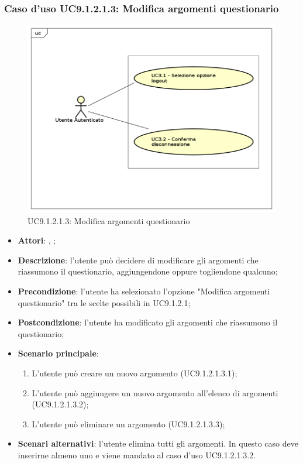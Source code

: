 					\subsubsection{Caso d'uso UC9.1.2.1.3: Modifica argomenti questionario}
					\label{UC9.1.2.1.3}
					\begin{figure}[h]
						\centering
					\includegraphics[scale=0.7,keepaspectratio]{UML/UC9.png}
						\caption{UC9.1.2.1.3: Modifica argomenti questionario}
					\end{figure}
					\FloatBarrier
					\begin{itemize}
						\item \textbf{Attori}: \uau, \uaupro;
						\item \textbf{Descrizione}: l'utente può decidere di modificare gli argomenti che riassumono il questionario, aggiungendone oppure togliendone qualcuno; 
						\item \textbf{Precondizione}: l'utente ha selezionato l'opzione "Modifica argomenti questionario" tra le scelte possibili in UC9.1.2.1; 
						\item \textbf{Postcondizione}: l'utente ha modificato gli argomenti che riassumono il questionario; 
						\item \textbf{Scenario principale}:
							\begin{enumerate}
								\item L'utente può creare un nuovo argomento (UC9.1.2.1.3.1);
								\item L'utente può aggiungere un nuovo argomento all'elenco di argomenti (UC9.1.2.1.3.2);
								\item L'utente può eliminare un argomento (UC9.1.2.1.3.3);
							\end{enumerate}
						\item \textbf{Scenari alternativi}: l'utente elimina tutti gli argomenti. In questo caso deve inserirne almeno uno e viene mandato al caso d'uso UC9.1.2.1.3.2.
					\end{itemize}
					
